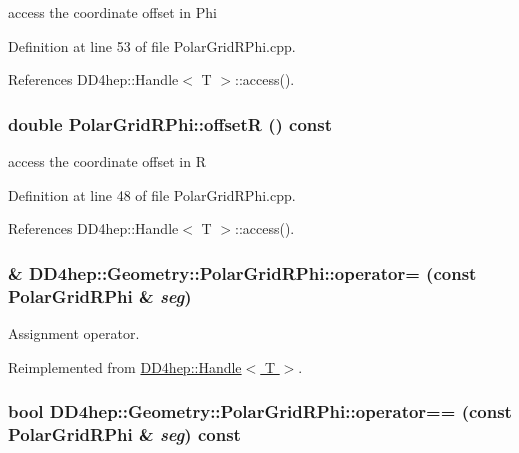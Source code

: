 access the coordinate offset in Phi 

Definition at line 53 of file PolarGridRPhi.cpp.

References DD4hep::Handle$<$ T $>$::access().\hypertarget{class_d_d4hep_1_1_geometry_1_1_polar_grid_r_phi_ad270ea1aca20ec0f8a62705f97077af0}{
\subsubsection[{offsetR}]{\setlength{\rightskip}{0pt plus 5cm}double PolarGridRPhi::offsetR () const}}
\label{class_d_d4hep_1_1_geometry_1_1_polar_grid_r_phi_ad270ea1aca20ec0f8a62705f97077af0}


access the coordinate offset in R 

Definition at line 48 of file PolarGridRPhi.cpp.

References DD4hep::Handle$<$ T $>$::access().\hypertarget{class_d_d4hep_1_1_geometry_1_1_polar_grid_r_phi_a6e176a9943b7b44441376e543b01037a}{
\subsubsection[{operator=}]{\& DD4hep::Geometry::PolarGridRPhi::operator= (const {\bf PolarGridRPhi} \& {\em seg})}}
\label{class_d_d4hep_1_1_geometry_1_1_polar_grid_r_phi_a6e176a9943b7b44441376e543b01037a}


Assignment operator. 

Reimplemented from \hyperlink{class_d_d4hep_1_1_handle_a9bbf8f498df42e81ad26fb00233505a6}{DD4hep::Handle$<$ T $>$}.\hypertarget{class_d_d4hep_1_1_geometry_1_1_polar_grid_r_phi_ab90c2c089a725998035253e56ecfd0a3}{
\subsubsection[{operator==}]{\setlength{\rightskip}{0pt plus 5cm}bool DD4hep::Geometry::PolarGridRPhi::operator== (const {\bf PolarGridRPhi} \& {\em seg}) const}}
\label{class_d_d4hep_1_1_geometry_1_1_polar_grid_r_phi_ab90c2c089a725998035253e56ecfd0a3}


